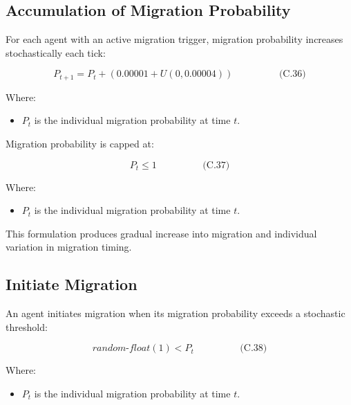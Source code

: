 \documentclass[
]{book}
\providecommand{\tightlist}{%
  \setlength{\itemsep}{0pt}\setlength{\parskip}{0pt}}
\begin{document}
\subsection{Accumulation of Migration Probability}\label{accumulation-of-migration-probability}

For each agent with an active migration trigger, migration probability
increases stochastically each tick:

\[
\begin{equation} P_{t+1}
= P_{t} +
\left(0.00001 + U(0, 0.00004)\right)  \hspace{2cm} \text{(C.36)} \end{equation}
\]

Where:

\begin{itemize}
\tightlist
\item
  \(P_{t}\) is the individual migration probability at time \(t\).
\end{itemize}

Migration probability is capped at:

\[
\begin{equation} P_{t} \le 1  \hspace{2cm} \text{(C.37)} \end{equation}
\]

Where:

\begin{itemize}
\tightlist
\item
  \(P_{t}\) is the individual migration probability at time \(t\).
\end{itemize}

This formulation produces gradual increase into migration and individual
variation in migration timing.

\subsection{Initiate Migration}\label{initiate-migration}

An agent initiates migration when its migration probability exceeds a
stochastic threshold:

\[
\begin{equation} random\text{-}float(1) < P_{t}  \hspace{2cm} \text{(C.38)} \end{equation}
\]

Where:

\begin{itemize}
\tightlist
\item
  \(P_{t}\) is the individual migration probability at time \(t\).
\end{itemize}
\end{document}

